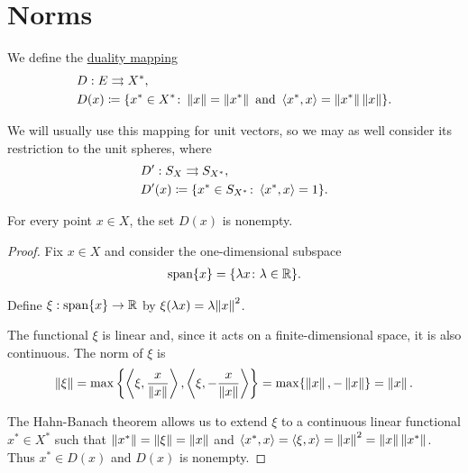 \section{Norms}\label{sec:norms}

\begin{definition}\cite[Example 2.26]{Phelps1993}
  We define the \uline{duality mapping}
  \begin{align*}
    &D: E \rightrightarrows X^*, \\
    &D(x) \coloneqq \{ x^* \in X^* \colon \left\Vert x \right\Vert = \left\Vert x^* \right\Vert \text{ and } \left\langle x^*, x \right\rangle = \left\Vert x^* \right\Vert \left\Vert x \right\Vert \}.
  \end{align*}
\end{definition}

\begin{note}
  We will usually use this mapping for unit vectors, so we may as well consider its restriction to the unit spheres, where
  \begin{align*}
    &D': S_X \rightrightarrows S_{X^*}, \\
    &D'(x) \coloneqq \{ x^* \in S_{X^*} \colon \left\langle x^*, x \right\rangle = 1 \}.
  \end{align*}
\end{note}

\begin{lemma}\label{thm:nonempty_banach_duality_mapping}
  For every point $x \in X$, the set $D(x)$ is nonempty.
\end{lemma}
\begin{proof}
  Fix $x \in X$ and consider the one-dimensional subspace
  \begin{align*}
    \operatorname{span} \{ x \}
    =
    \{ \lambda x \colon \lambda \in \mathbb{R} \}.
  \end{align*}

  Define $\xi: \operatorname{span} \{ x \} \to \mathbb{R}$ by $\xi(\lambda x) = \lambda {\left\Vert x \right\Vert}^2$.

  The functional $\xi$ is linear and, since it acts on a finite-dimensional space, it is also continuous. The norm of $\xi$ is
  \begin{align*}
    \left\Vert \xi \right\Vert = \max \left\{ \left\langle \xi, \frac x {\left\Vert x \right\Vert} \right\rangle, \left\langle \xi, -\frac x {\left\Vert x \right\Vert} \right\rangle \right\} = \max \{ \left\Vert x \right\Vert, -\left\Vert x \right\Vert \} = \left\Vert x \right\Vert.
  \end{align*}

  The Hahn-Banach theorem allows us to extend $\xi$ to a continuous linear functional $x^* \in X^*$ such that $\left\Vert x^* \right\Vert = \left\Vert \xi \right\Vert = \left\Vert x \right\Vert$ and $\left\langle x^*, x \right\rangle = \left\langle \xi, x \right\rangle = \left\Vert x \right\Vert^2 = \left\Vert x \right\Vert \left\Vert x^* \right\Vert$. Thus $x^* \in D(x)$ and $D(x)$ is nonempty.
\end{proof}

